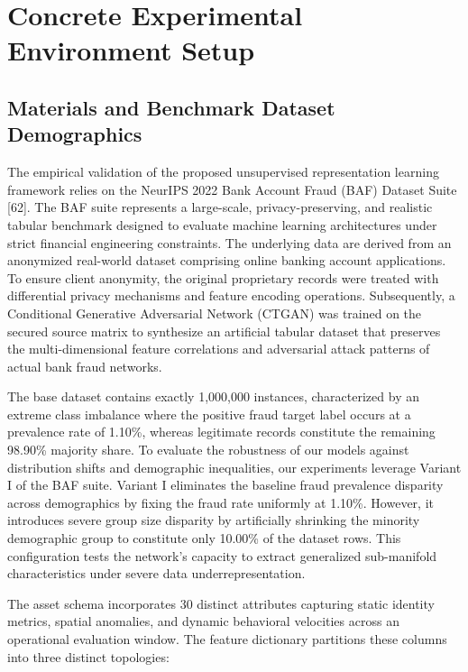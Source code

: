 \documentclass[11pt,a4paper]{report}
\begin{document}
\section{Concrete Experimental Environment Setup}

\subsection{Materials and Benchmark Dataset Demographics}
The empirical validation of the proposed unsupervised representation learning framework relies on the NeurIPS 2022 Bank Account Fraud (BAF) Dataset Suite [62]. The BAF suite represents a large-scale, privacy-preserving, and realistic tabular benchmark designed to evaluate machine learning architectures under strict financial engineering constraints. The underlying data are derived from an anonymized real-world dataset comprising online banking account applications. To ensure client anonymity, the original proprietary records were treated with differential privacy mechanisms and feature encoding operations. Subsequently, a Conditional Generative Adversarial Network (CTGAN) was trained on the secured source matrix to synthesize an artificial tabular dataset that preserves the multi-dimensional feature correlations and adversarial attack patterns of actual bank fraud networks. 

The base dataset contains exactly 1,000,000 instances, characterized by an extreme class imbalance where the positive fraud target label occurs at a prevalence rate of 1.10\%, whereas legitimate records constitute the remaining 98.90\% majority share. To evaluate the robustness of our models against distribution shifts and demographic inequalities, our experiments leverage Variant I of the BAF suite. Variant I eliminates the baseline fraud prevalence disparity across demographics by fixing the fraud rate uniformly at 1.10\%. However, it introduces severe group size disparity by artificially shrinking the minority demographic group to constitute only 10.00\% of the dataset rows. This configuration tests the network's capacity to extract generalized sub-manifold characteristics under severe data underrepresentation. 

The asset schema incorporates 30 distinct attributes capturing static identity metrics, spatial anomalies, and dynamic behavioral velocities across an operational evaluation window. The feature dictionary partitions these columns into three distinct topologies:
\end{document}
